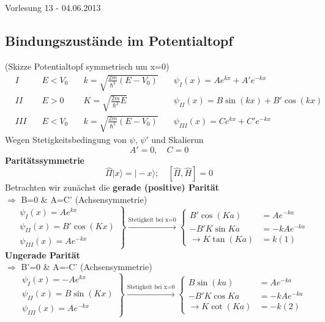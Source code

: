 \documentclass[10pt,article,colorback,accentcolor=tud9d]{scrartcl}
\begin{document}
\begin{flushright}
Vorlesung 13 - 04.06.2013
\end{flushright}

\subsection{Bindungszustände im Potentialtopf}
(Skizze Potentialtopf symmetrisch um x=0)
\begin{align}
&I \quad &E<V_0 \quad &k=\sqrt{\frac{2m}{\hbar^2}(E-V_0)}\quad &\psi_I(x)=Ae^{kx}+A'e^{-kx}\\
&II\quad &E>0 \quad &K=\sqrt{\frac{2m}{\hbar^2}E}\quad &\psi_{II}(x)=B\sin(kx)+B'\cos(kx)\\
&III\quad &E<V_0 \quad &k=\sqrt{\frac{2m}{\hbar^2}(E-V_0)}\quad &\psi_{III}(x)=Ce^{kx}+C'e^{-kx}
\end{align}
Wegen Stetigkeitsbedingung von $\psi$, $\psi'$ und Skalierun
\begin{equation}
A'=0, \quad C=0
\end{equation}
\textbf{Paritätssymmetrie}
\begin{equation}
\hat{\Pi}|x\rangle=|-x\rangle;\quad [\hat{\Pi},\hat{H}]=0
\end{equation}
Betrachten wir zunächst die \textbf{gerade (positive) Parität}\\
$\Rightarrow$ B=0 \& A=C' (Achsensymmetrie)
\begin{equation}
\left.
\begin{aligned}
&\psi_I(x)=Ae^{kx}\\
&\psi_{II}(x)=B'\cos(Kx)\\
&\psi_{III}(x)=Ae^{-kx}
\end{aligned}
\right\} \xrightarrow{\text{Stetigkeit bei x=0}}\left\{
\begin{aligned}
B'\cos(Ka)&=Ae^{-ka}\\
-B'K\sin{Ka}&=-kAe^{-ka}\\
\rightarrow K\tan(Ka)&=k (1)
\end{aligned}
\right.
\end{equation}
\textbf{Ungerade Parität}\\
$\Rightarrow$ B'=0 \& A=-C' (Achsensymmetrie)
\begin{equation}
\left.
\begin{aligned}
&\psi_I(x)=-Ae^{kx}\\
&\psi_{II}(x)=B\sin(Kx)\\
&\psi_{III}(x)=Ae^{-kx}
\end{aligned}
\right\} \xrightarrow{\text{Stetigkeit bei x=0}}\left\{
\begin{aligned}
B\sin(ka)&=Ae^{-ka}\\
-B'K\cos{Ka}&=-kAe^{-ka}\\
\rightarrow K\cot(Ka)&=-k (2)
\end{aligned}
\right.
\end{equation}
\end{document}
